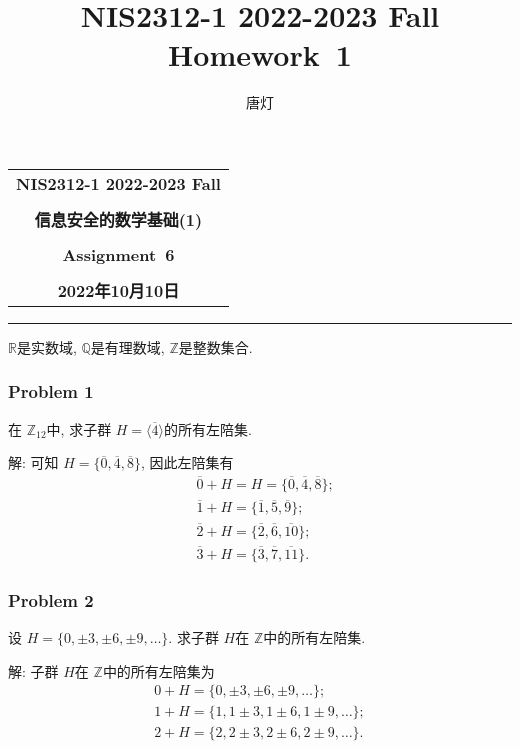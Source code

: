 \documentclass[a4paper,12pt]{ctexart}
\title{NIS2312-1 2022-2023 Fall Homework~1}
\author{唐灯}
\newcommand{\Z}{\mathbb{Z}}
\newcommand{\Q}{\mathbb{Q}}
\newcommand{\R}{\mathbb{R}}
\begin{document}
  \begin{center}

  \vspace{-0.3in}
  \begin{tabular}{c}
    \textbf{\Large NIS2312-1 2022-2023 Fall} \\
    \textbf{\Large  } \\
    \textbf{\Large  信息安全的数学基础(1)} \\
    \textbf{\Large  } \\
    \textbf{\Large  Assignment~6} \\
    \textbf{\Large  } \\
    \textbf{\Large 2022年10月10日} \\
  \end{tabular}
  \end{center}
  \noindent
  \rule{\linewidth}{0.4pt}
  
$ \R $是实数域, $ \Q $是有理数域, $ \Z $是整数集合.

\subsubsection*{Problem 1}
  在 $ \Z_{12} $中, 求子群 $ H=\langle \overline{4}\rangle $的所有左陪集.
      
  解: 可知 $ H=\{\overline{0},\overline{4},\overline{8}\} $, 因此左陪集有
  \begin{align*}
    &\overline{0}+H=H=\{\overline{0},\overline{4},\overline{8}\};\\
    &\overline{1}+H=\{\overline{1},\overline{5},\overline{9}\};\\
    &\overline{2}+H=\{\overline{2},\overline{6},\overline{10}\};\\
    &\overline{3}+H=\{\overline{3},\overline{7},\overline{11}\}.
  \end{align*}

\subsubsection*{Problem 2} 
  设 $ H=\{0,\pm 3,\pm 6,\pm 9,\dots\} $. 求子群 $ H $在 $ \Z $中的所有左陪集.
  
  解: 子群 $ H $在 $ \Z $中的所有左陪集为
  \begin{align*}
    0+H=\{0,\pm 3,\pm 6,\pm 9,\dots\};\\
    1+H=\{1,1\pm 3,1\pm 6,1\pm 9,\dots\};\\
    2+H=\{2,2\pm 3,2\pm 6,2\pm 9,\dots\}.
  \end{align*}
\end{document}
